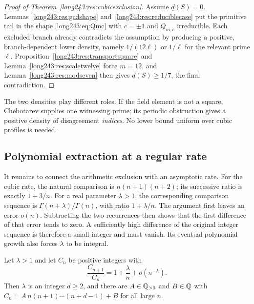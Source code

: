 \documentclass[11pt]{article}
\begin{document}
\begin{proof}[Proof of Theorem~\ref{long243:res:cubicexclusion}]
Assume $\underline d(S)=0$.  Lemmas~\ref{long243:res:gcdshape}
and~\ref{long243:res:reduciblecase} put the primitive tail in the shape \eqref{long243:eq:Qmc}
with $c=\pm1$ and $Q_{m,c}$ irreducible.  Each excluded branch already
contradicts the assumption by producing a positive, branch-dependent lower
density, namely $1/(12\ell)$ or $1/\ell$ for the relevant prime $\ell$.
Proposition~\ref{long243:res:transportsquare} and Lemma~\ref{long243:res:scaletwelve} force
$m=12$, and Lemma~\ref{long243:res:modseven} then gives
$\underline d(S)\ge1/7$, the final contradiction.
\end{proof}

The two densities play different roles. If the field element is not
a square, Chebotarev supplies one witnessing prime; its periodic
obstruction gives a positive density of disagreement \emph{indices}.
No lower bound uniform over cubic profiles is needed.

\subsection{Polynomial extraction at a regular rate}

It remains to connect the arithmetic exclusion with an asymptotic
rate. For the cubic rate, the natural comparison is $n(n+1)(n+2)$;
its successive ratio is exactly $1+3/n$. For a real parameter
$\lambda>1$, the corresponding comparison sequence is
$\Gamma(n+\lambda)/\Gamma(n)$, with ratio $1+\lambda/n$.
The argument first leaves an error $o(n)$. Subtracting the two
recurrences then shows that the first difference of that error tends
to zero. A sufficiently high difference of the original integer
sequence is therefore a small integer and must vanish. Its eventual
polynomial growth also forces $\lambda$ to be integral.

\begin{lemma}\label{long243:res:extraction}
Let $\lambda>1$ and let $C_n$ be positive integers with
\begin{equation}\label{long243:eq:regularrate}
 \frac{C_{n+1}}{C_n}=1+\frac\lambda n+o(n^{-\lambda}).
\end{equation}
Then $\lambda$ is an integer $d\ge2$, and there are $A\in\mathbb{Q}_{>0}$ and
$B\in\mathbb{Q}$ with $C_n=A\,n(n+1)\cdots(n+d-1)+B$ for all large $n$.
\end{lemma}
\end{document}
